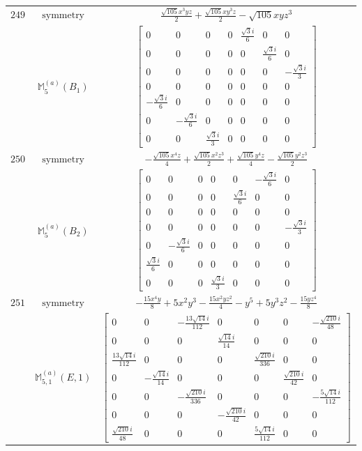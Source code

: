 \documentclass[fleqn,8pt,landscape]{jsarticle}
\begin{document}
\begin{longtable}{ccc}
$ 249 $ & $ \text{symmetry} $ & $ \frac{\sqrt{105} x^{3} y z}{2} + \frac{\sqrt{105} x y^{3} z}{2} - \sqrt{105} x y z^{3} $ \\
$  $ & $ \mathbb{M}_{5}^{(a)}(B_{1}) $ & $ \begin{bmatrix} 0 & 0 & 0 & 0 & \frac{\sqrt{3} i}{6} & 0 & 0 \\ 0 & 0 & 0 & 0 & 0 & \frac{\sqrt{3} i}{6} & 0 \\ 0 & 0 & 0 & 0 & 0 & 0 & - \frac{\sqrt{3} i}{3} \\ 0 & 0 & 0 & 0 & 0 & 0 & 0 \\ - \frac{\sqrt{3} i}{6} & 0 & 0 & 0 & 0 & 0 & 0 \\ 0 & - \frac{\sqrt{3} i}{6} & 0 & 0 & 0 & 0 & 0 \\ 0 & 0 & \frac{\sqrt{3} i}{3} & 0 & 0 & 0 & 0 \end{bmatrix} $ \\ \hline
$ 250 $ & $ \text{symmetry} $ & $ - \frac{\sqrt{105} x^{4} z}{4} + \frac{\sqrt{105} x^{2} z^{3}}{2} + \frac{\sqrt{105} y^{4} z}{4} - \frac{\sqrt{105} y^{2} z^{3}}{2} $ \\
$  $ & $ \mathbb{M}_{5}^{(a)}(B_{2}) $ & $ \begin{bmatrix} 0 & 0 & 0 & 0 & 0 & - \frac{\sqrt{3} i}{6} & 0 \\ 0 & 0 & 0 & 0 & \frac{\sqrt{3} i}{6} & 0 & 0 \\ 0 & 0 & 0 & 0 & 0 & 0 & 0 \\ 0 & 0 & 0 & 0 & 0 & 0 & - \frac{\sqrt{3} i}{3} \\ 0 & - \frac{\sqrt{3} i}{6} & 0 & 0 & 0 & 0 & 0 \\ \frac{\sqrt{3} i}{6} & 0 & 0 & 0 & 0 & 0 & 0 \\ 0 & 0 & 0 & \frac{\sqrt{3} i}{3} & 0 & 0 & 0 \end{bmatrix} $ \\ \hline
$ 251 $ & $ \text{symmetry} $ & $ - \frac{15 x^{4} y}{8} + 5 x^{2} y^{3} - \frac{15 x^{2} y z^{2}}{4} - y^{5} + 5 y^{3} z^{2} - \frac{15 y z^{4}}{8} $ \\
$  $ & $ \mathbb{M}_{5,1}^{(a)}(E,1) $ & $ \begin{bmatrix} 0 & 0 & - \frac{13 \sqrt{14} i}{112} & 0 & 0 & 0 & - \frac{\sqrt{210} i}{48} \\ 0 & 0 & 0 & \frac{\sqrt{14} i}{14} & 0 & 0 & 0 \\ \frac{13 \sqrt{14} i}{112} & 0 & 0 & 0 & \frac{\sqrt{210} i}{336} & 0 & 0 \\ 0 & - \frac{\sqrt{14} i}{14} & 0 & 0 & 0 & \frac{\sqrt{210} i}{42} & 0 \\ 0 & 0 & - \frac{\sqrt{210} i}{336} & 0 & 0 & 0 & - \frac{5 \sqrt{14} i}{112} \\ 0 & 0 & 0 & - \frac{\sqrt{210} i}{42} & 0 & 0 & 0 \\ \frac{\sqrt{210} i}{48} & 0 & 0 & 0 & \frac{5 \sqrt{14} i}{112} & 0 & 0 \end{bmatrix} $ \\ \hline

\end{longtable}
\end{document}
